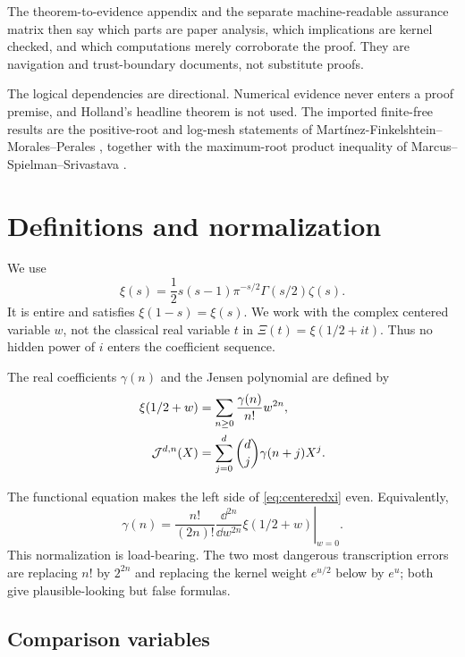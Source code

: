 \documentclass[12pt]{article}
\begin{document}
The theorem-to-evidence appendix and the separate machine-readable assurance
matrix then say which parts are paper analysis, which implications are
kernel checked, and which computations merely corroborate the proof.  They
are navigation and trust-boundary documents, not substitute proofs.

The logical dependencies are directional.  Numerical evidence never enters
a proof premise, and Holland's headline theorem is not used.  The imported
finite-free results are the positive-root and log-mesh statements of
Mart\'inez-Finkelshtein--Morales--Perales \cite{MMP2024}, together with the
maximum-root product inequality of Marcus--Spielman--Srivastava
\cite[Theorem~1.6]{MSS2022}.

\section{Definitions and normalization}\label{sec:definitions}

We use
\[
 \xi(s)=\frac12s(s-1)\pi^{-s/2}\Gamma(s/2)\zeta(s).
\]
It is entire and satisfies $\xi(1-s)=\xi(s)$.  We work with the complex
centered variable $w$, not the classical real variable $t$ in
$\Xi(t)=\xi(1/2+it)$.  Thus no hidden power of $i$ enters the coefficient
sequence.

\begin{definition}
The real coefficients $\gamma(n)$ and the Jensen polynomial are defined by
\begin{align}
 \xi(1/2+w)&=\sum_{n\ge0}\frac{\gamma(n)}{n!}w^{2n},
 \label{eq:centeredxi}\\
 \mathcal J^{d,n}(X)&=\sum_{j=0}^{d}\binom dj\gamma(n+j)X^j.
 \label{eq:jensen}
\end{align}
\end{definition}

The functional equation makes the left side of \eqref{eq:centeredxi} even.
Equivalently,
\begin{equation}\label{eq:taylor-normalization}
 \gamma(n)=\frac{n!}{(2n)!}
 \left.\frac{\dd^{2n}}{\dd w^{2n}}\xi(1/2+w)\right|_{w=0}.
\end{equation}
This normalization is load-bearing.  The two most dangerous transcription
errors are replacing $n!$ by $2^{2n}$ and replacing the kernel weight
$e^{u/2}$ below by $e^u$; both give plausible-looking but false formulas.

\subsection{Comparison variables}
\end{document}
